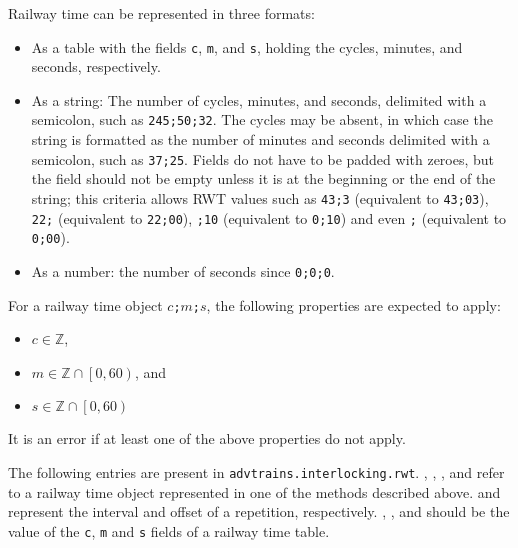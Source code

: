 Railway time can be represented in three formats:
\begin{itemize}
\item As a table with the fields \texttt{c}, \texttt{m}, and \texttt{s}, holding the cycles, minutes, and seconds, respectively.
\item As a string: The number of cycles, minutes, and seconds, delimited with a semicolon, such as \texttt{245;50;32}. The cycles may be absent, in which case the string is formatted as the number of minutes and seconds delimited with a semicolon, such as \texttt{37;25}. Fields do not have to be padded with zeroes, but the field should not be empty unless it is at the beginning or the end of the string; this criteria allows RWT values such as \texttt{43;3} (equivalent to \texttt{43;03}), \texttt{22;} (equivalent to \texttt{22;00}), \texttt{;10} (equivalent to \texttt{0;10}) and even \texttt{;} (equivalent to \texttt{0;00}).
\item As a number: the number of seconds since \texttt{0;0;0}.
\end{itemize}

For a railway time object \texttt{$c$;$m$;$s$}, the following properties are expected to apply:
\begin{itemize}
\item $c \in \mathbb{Z}$,
\item $m \in \mathbb{Z} \cap \left[0,60\right)$, and
\item $s \in \mathbb{Z} \cap \left[0,60\right)$
\end{itemize}
It is an error if at least one of the above properties do not apply.

The following entries are present in \texttt{advtrains.interlocking.rwt}. , , , and  refer to a railway time object represented in one of the methods described above.  and  represent the interval and offset of a repetition, respectively. , , and  should be the value of the \texttt{c}, \texttt{m} and \texttt{s} fields of a railway time table.

